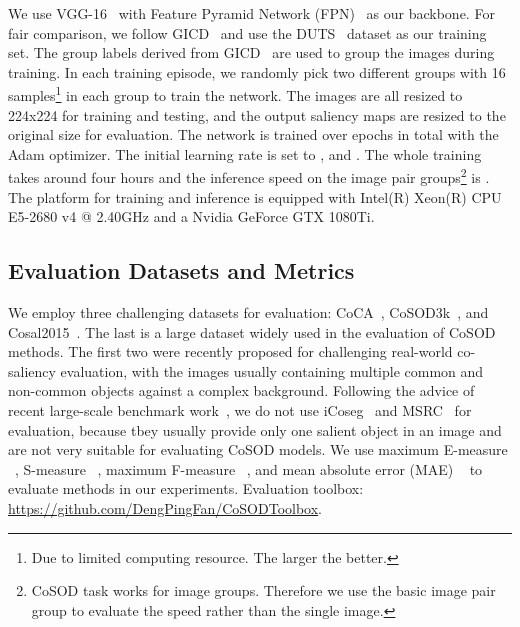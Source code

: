 \documentclass[final]{cvpr}
\begin{document}
We use VGG-16~\cite{simonyan2014very} with Feature Pyramid Network (FPN)~\cite{lin2017feature} as our backbone. 
For fair comparison, we follow GICD~\cite{zhang2020gradient} and use the DUTS~\cite{wang2017learning} dataset as our training set. The group labels derived from  GICD~\cite{zhang2020gradient} are used to group the images during training. In each training episode, we randomly pick two different groups with 16 samples\footnote{Due to limited computing resource. The larger the better.} in each  group to train the network. 
The images are all resized to 224x224 for training and testing, and the output saliency maps are resized to the original size for evaluation. The network is trained over  epochs in total with the Adam optimizer. The initial learning rate is set to ,  and . The whole training takes around four hours and the inference speed on the image pair groups\footnote{CoSOD task works for image groups. Therefore we use the basic image pair group to evaluate the speed rather than the single image.} is  . The platform for training and inference is equipped with  Intel(R) Xeon(R) CPU E5-2680 v4 @ 2.40GHz and a Nvidia GeForce GTX 1080Ti.





\subsection{Evaluation Datasets and  Metrics}
We employ three challenging datasets for evaluation:
CoCA~\cite{zhang2020gradient}, CoSOD3k~\cite{fan2020taking}, and Cosal2015~\cite{zhang2016detection}. The last is a large dataset widely used in the evaluation of CoSOD methods. The first two were recently proposed for  challenging real-world co-saliency evaluation, with the images usually containing multiple common and non-common objects against a complex background. 
Following the advice of recent large-scale benchmark work~\cite{fan2020taking}, we do not use iCoseg~\cite{batra2010icoseg} and MSRC~\cite{winn2005object} for evaluation, because tbey usually provide only one salient object in an image and are not very suitable for evaluating CoSOD models.
We use maximum E-measure ~\cite{fan2018enhanced},  S-measure 
~\cite{fan2017structure},  maximum F-measure ~\cite{achanta2009frequency}, and mean absolute error (MAE) ~\cite{cheng2013efficient} to evaluate methods in our experiments. Evaluation toolbox: \url{https://github.com/DengPingFan/CoSODToolbox}. 
\end{document}
